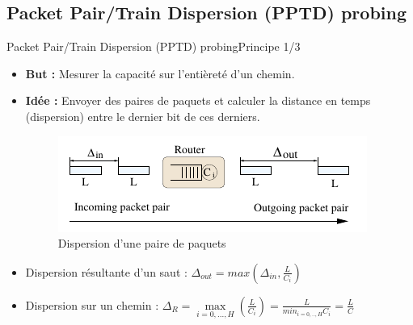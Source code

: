 \documentclass[compress]{beamer}
\begin{document}

\subsection{Packet Pair/Train Dispersion (PPTD) probing}
\begin{frame}{Packet Pair/Train Dispersion (PPTD) probing}{Principe 1/3}
\begin{itemize}
	\item \textbf{But :} Mesurer la {\color{red}capacité} sur l'entièreté d'un chemin. 
	\item \textbf{Idée :} Envoyer des {\color{red}paires de paquets} et calculer la distance en temps (dispersion) entre le dernier bit de ces derniers. 
	\begin{figure}[hbtp]
		\centering
		\includegraphics[scale=0.6]{schema5.png}
		\caption{Dispersion d'une paire de paquets}
	\end{figure}
	\item Dispersion résultante d'un saut : $\Delta_{out} = max (\Delta_{in} , \frac{L}{C_i})$
	\item Dispersion sur un chemin : $\Delta_R = \max\limits_{i=0,...,H} (\frac{L}{C_i}) = \frac{L}{min_{i=0,..,H}C_i} = \frac{L}{C}$
\end{itemize}
\end{frame}

\end{document}
